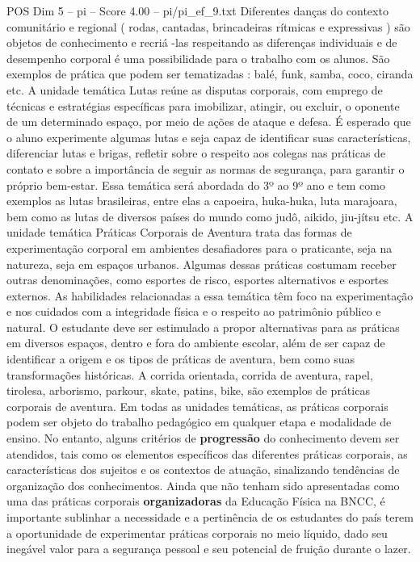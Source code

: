 \begin{textsample}{POS Dim 5 – pi – Score 4.00 – pi/pi\_ef\_9.txt}
Diferentes danças do contexto comunitário e regional ( rodas, cantadas, brincadeiras rítmicas e expressivas ) são objetos de conhecimento e recriá -las respeitando as diferenças individuais e de desempenho corporal é uma possibilidade para o trabalho com os alunos.
São exemplos de prática que podem ser tematizadas : balé, funk, samba, coco, ciranda etc.
A unidade temática Lutas reúne as disputas corporais, com emprego de técnicas e estratégias específicas para imobilizar, atingir, ou excluir, o oponente de um determinado espaço, por meio de ações de ataque e defesa.
É esperado que o aluno experimente algumas lutas e seja capaz de identificar suas características, diferenciar lutas e brigas, refletir sobre o respeito aos colegas nas práticas de contato e sobre a importância de seguir as normas de segurança, para garantir o próprio bem-estar.
Essa temática será abordada do 3º ao 9º ano e tem como exemplos as lutas brasileiras, entre elas a capoeira, huka-huka, luta marajoara, bem como as lutas de diversos países do mundo como judô, aikido, jiu-jítsu etc.
A unidade temática Práticas Corporais de Aventura trata das formas de experimentação corporal em ambientes desafiadores para o praticante, seja na natureza, seja em espaços urbanos.
Algumas dessas práticas costumam receber outras denominações, como esportes de risco, esportes alternativos e esportes externos.
As habilidades relacionadas a essa temática têm foco na experimentação e nos cuidados com a integridade física e o respeito ao patrimônio público e natural.
O estudante deve ser estimulado a propor alternativas para as práticas em diversos espaços, dentro e fora do ambiente escolar, além de ser capaz de identificar a origem e os tipos de práticas de aventura, bem como suas transformações históricas.
A corrida orientada, corrida de aventura, rapel, tirolesa, arborismo, parkour, skate, patins, bike, são exemplos de práticas corporais de aventura.
Em todas as unidades temáticas, as práticas corporais podem ser objeto do trabalho pedagógico em qualquer etapa e modalidade de ensino.
No entanto, alguns critérios de \textbf{progressão} do conhecimento devem ser atendidos, tais como os elementos específicos das diferentes práticas corporais, as características dos sujeitos e os contextos de atuação, sinalizando tendências de organização dos conhecimentos.
Ainda que não tenham sido apresentadas como uma das práticas corporais \textbf{organizadoras} da Educação Física na BNCC, é importante sublinhar a necessidade e a pertinência de os estudantes do país terem a oportunidade de experimentar práticas corporais no meio líquido, dado seu inegável valor para a segurança pessoal e seu potencial de fruição durante o lazer.

\end{textsample}
